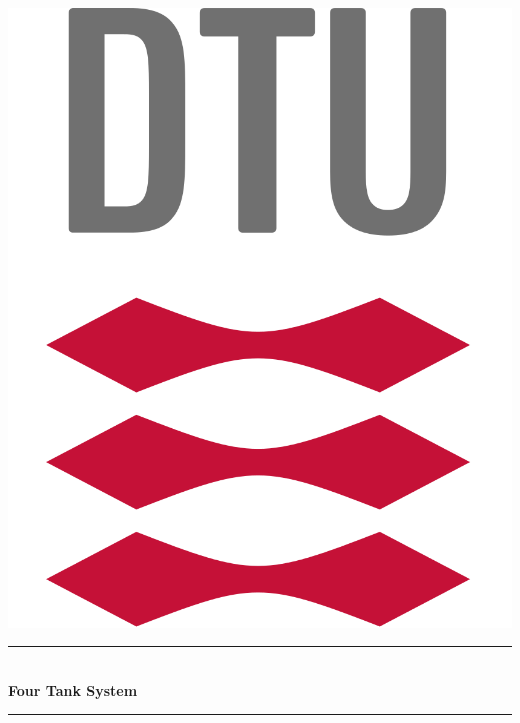 \documentclass[12pt,a4paper]{article}
\theoremstyle{definition}
\begin{document}

\begin{titlepage}

\newcommand{\HRule}{\rule{\linewidth}{0.5mm}} %

\center %
\includegraphics[scale=0.15]{Figures/dtulogo3.png} \\ 
\vspace{1cm}

\HRule \\[0.3cm]{ \LARGE \bfseries Four Tank System}\\[0.1cm] %


\HRule \\[0.1cm]


\end{titlepage}
\end{document}
